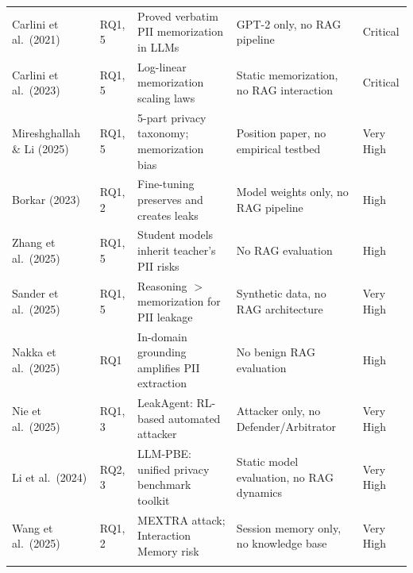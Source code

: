 \documentclass[12pt, a4paper]{article}
\begin{document}
\begin{small}
\begin{longtable}{L{3cm} C{1.2cm} L{3.5cm} L{3.5cm} C{1.5cm}}
\midrule
{}
 \\
\midrule

Carlini et al.\ (2021) & RQ1, 5 & Proved verbatim PII memorization in LLMs & GPT-2 only, no RAG pipeline & Critical \\
Carlini et al.\ (2023) & RQ1, 5 & Log-linear memorization scaling laws & Static memorization, no RAG interaction & Critical \\
Mireshghallah \& Li (2025) & RQ1, 5 & 5-part privacy taxonomy; memorization bias & Position paper, no empirical testbed & Very High \\
Borkar (2023) & RQ1, 2 & Fine-tuning preserves and creates leaks & Model weights only, no RAG pipeline & High \\
Zhang et al.\ (2025) & RQ1, 5 & Student models inherit teacher's PII risks & No RAG evaluation & High \\
Sander et al.\ (2025) & RQ1, 5 & Reasoning $>$ memorization for PII leakage & Synthetic data, no RAG architecture & Very High \\
Nakka et al.\ (2025) & RQ1 & In-domain grounding amplifies PII extraction & No benign RAG evaluation & High \\
Nie et al.\ (2025) & RQ1, 3 & LeakAgent: RL-based automated attacker & Attacker only, no Defender/Arbitrator & Very High \\
Li et al.\ (2024) & RQ2, 3 & LLM-PBE: unified privacy benchmark toolkit & Static model evaluation, no RAG dynamics & Very High \\
Wang et al.\ (2025) & RQ1, 2 & MEXTRA attack; Interaction Memory risk & Session memory only, no knowledge base & Very High \\

\midrule
{}
 \\
\midrule


\end{longtable}
\end{small}
\end{document}
